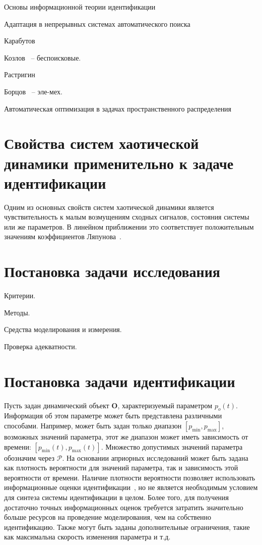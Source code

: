 Основы информационной теории идентификации~\cite{info_cipkin,straton_inf,karabut}

Адаптация в непрерывных системах автоматического поиска~\cite{adopt_cont_sys}

Карабутов~\cite{karabutov_adapt_id_sys,saliga_id_ctl_black}

Козлов~\cite{kozlov_nosearch_sns} -- беспоисковые.

Растригин~\cite{rastr_stat_meth_search,rastr_seu,rastr_intro,rastr_adop_complex_sys,rastr_rand_search}

Борцов~\cite{borcov} -- эле-мех.

Автоматическая оптимизация в задачах пространственного распределения~\cite{auto_optim_intask}



\section{Свойства систем хаотической динамики применительно к задаче идентификации}  %

Одним из основных свойств систем хаотической динамики является чувствительность
к малым возмущениям сходных сигналов, состояния системы или же параметров.
В линейном приближении это соответствует положительным значениям
коэффициентов Ляпунова~\cite{magni_theory_dyn_chaos,moon_chaotic_vibr}.



\section{Постановка задачи исследования}  %

Критерии.

Методы.

Средства моделирования и измерения.

Проверка адекватности.



\section{Постановка задачи идентификации}  %

Пусть задан динамический объект $ \mathbf{O}$, характеризуемый параметром $p_o(t)$.
Информация об этом параметре может быть представлена
различными способами. Например, может быть задан только диапазон
$[p_{\min}, p_{\max}]$,
возможных значений параметра,
этот же диапазон может иметь зависимость от времени:
$[p_{\min}(t), p_{\max}(t)]$.
Множество допустимых значений параметра обозначим через $\mathcal{P}$.
На основании априорных исследований может
быть задана как плотность вероятности для значений параметра,
так и зависимость этой вероятности от времени. Наличие плотности вероятности
позволяет использовать информационные оценки идентификации~\cite{info_cipkin,atu_asau10},
но не является необходимым условием для синтеза системы идентификации в целом.
Более того, для получения достаточно точных информационных оценок
требуется затратить значительно больше ресурсов на проведение моделирования,
чем на собственно идентификацию.
Также могут быть заданы дополнительные ограничения, такие как максимальна скорость
изменения параметра и т.д.

